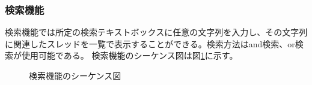 \documentclass[a4j]{jarticle}
\begin{document}
\subsubsection{検索機能}
    検索機能では所定の検索テキストボックスに任意の文字列を入力し、その文字列に関連したスレッドを一覧で表示することができる。検索方法はand検索、or検索が使用可能である。
    検索機能のシーケンス図は図\ref{fig:search_keyword.png}に示す。
        \begin{figure}[H]
\centering
{}
\caption{検索機能のシーケンス図}
\label{fig:search_keyword.png}
\end{figure}
\end{document}
